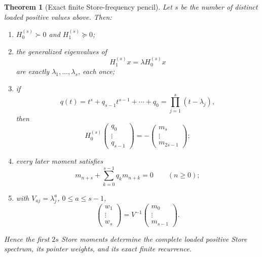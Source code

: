 \documentclass[11pt]{article}
\newtheorem{theorem}{Theorem}[section]
\theoremstyle{definition}
\theoremstyle{remark}
\begin{document}
\begin{theorem}[Exact finite Store-frequency pencil]
\label{thm:store-frequency-pencil-master}
Let $s$ be the number of distinct loaded positive values above.  Then:
\begin{enumerate}[label=\textup{(\roman*)},leftmargin=2.8em]
\item $H_0^{(s)}\succ0$ and $H_1^{(s)}\succeq0$;
\item the generalized eigenvalues of
      \begin{equation}
        H_1^{(s)}x=\lambda H_0^{(s)}x
        \label{eq:store-pencil-eigen-master}
      \end{equation}
      are exactly $\lambda_1,\ldots,\lambda_s$, each once;
\item if
      \[
        q(t)=t^s+q_{s-1}t^{s-1}+\cdots+q_0
            =\prod_{j=1}^{s}(t-\lambda_j),
      \]
      then
      \begin{equation}
        \boxed{
        H_0^{(s)}
        \begin{pmatrix}q_0\\ \vdots\\ q_{s-1}\end{pmatrix}
        =-
        \begin{pmatrix}m_s\\ \vdots\\ m_{2s-1}\end{pmatrix};}
        \label{eq:store-annihilator-master}
      \end{equation}
\item every later moment satisfies
      \begin{equation}
        \boxed{
        m_{n+s}+\sum_{k=0}^{s-1}q_km_{n+k}=0
        \qquad(n\ge0);}
        \label{eq:store-recurrence-master}
      \end{equation}
\item with $V_{aj}=\lambda_j^a$, $0\le a\le s-1$,
      \begin{equation}
        \boxed{
        \begin{pmatrix}w_1\\ \vdots\\ w_s\end{pmatrix}
        =V^{-1}
        \begin{pmatrix}m_0\\ \vdots\\ m_{s-1}\end{pmatrix}.}
        \label{eq:store-weight-recovery-master}
      \end{equation}
\end{enumerate}
Hence the first $2s$ Store moments determine the complete loaded positive
Store spectrum, its pointer weights, and its exact finite recurrence.
\end{theorem}
\end{document}
